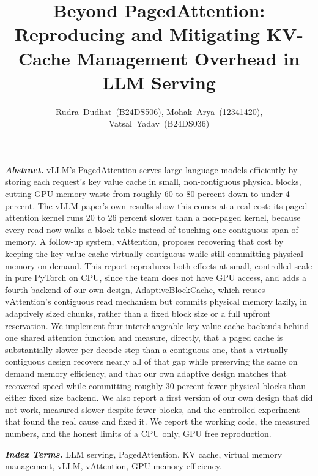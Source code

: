 \documentclass[lettersize,journal]{IEEEtran}
\begin{document}
\title{Beyond PagedAttention: Reproducing and Mitigating KV-Cache Management Overhead in LLM Serving}

\author{Rudra~Dudhat~(B24DS506), Mohak~Arya~(12341420), Vatsal~Yadav~(B24DS036)}


\maketitle

\noindent\textbf{\textit{Abstract.}} vLLM's PagedAttention serves large language models efficiently by storing each request's key value cache in small, non-contiguous physical blocks, cutting GPU memory waste from roughly 60 to 80 percent down to under 4 percent. The vLLM paper's own results show this comes at a real cost: its paged attention kernel runs 20 to 26 percent slower than a non-paged kernel, because every read now walks a block table instead of touching one contiguous span of memory. A follow-up system, vAttention, proposes recovering that cost by keeping the key value cache virtually contiguous while still committing physical memory on demand. This report reproduces both effects at small, controlled scale in pure PyTorch on CPU, since the team does not have GPU access, and adds a fourth backend of our own design, AdaptiveBlockCache, which reuses vAttention's contiguous read mechanism but commits physical memory lazily, in adaptively sized chunks, rather than a fixed block size or a full upfront reservation. We implement four interchangeable key value cache backends behind one shared attention function and measure, directly, that a paged cache is substantially slower per decode step than a contiguous one, that a virtually contiguous design recovers nearly all of that gap while preserving the same on demand memory efficiency, and that our own adaptive design matches that recovered speed while committing roughly 30 percent fewer physical blocks than either fixed size backend. We also report a first version of our own design that did not work, measured slower despite fewer blocks, and the controlled experiment that found the real cause and fixed it. We report the working code, the measured numbers, and the honest limits of a CPU only, GPU free reproduction.

\noindent\textbf{\textit{Index Terms.}} LLM serving, PagedAttention, KV cache, virtual memory management, vLLM, vAttention, GPU memory efficiency.
\end{document}
